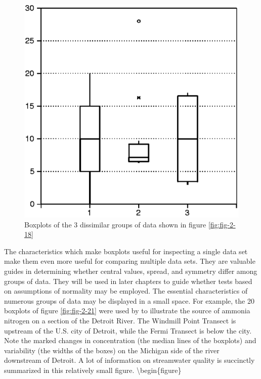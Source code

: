 \documentclass[]{book}
\begin{document}
\begin{figure}

{\centering \includegraphics[width=9.26in]{figures/2_20} 

}

\caption{Boxplots of the 3 dissimilar groups of data shown in figure \ref{fig:fig-2-18}}\label{fig:fig-2-20}
\end{figure}

The characteristics which make boxplots useful for inspecting a single data set make them even more useful for comparing multiple data sets. They are valuable guides in determining whether central values, spread, and symmetry differ among groups of data. They will be used in later chapters to guide whether tests based on assumptions of normality may be employed. The essential characteristics of numerous groups of data may be displayed in a small space. For example, the 20 boxplots of figure \ref{fig:fig-2-21} were used by \citet{holtschlag_changes_1987} to illustrate the source of ammonia nitrogen on a section of the Detroit River. The Windmill Point Transect is upstream of the U.S. city of Detroit, while the Fermi Transect is below the city. Note the marked changes in concentration (the median lines of the boxplots) and variability (the widths of the boxes) on the Michigan side of the river downstream of Detroit. A lot of information on streamwater quality is succinctly summarized in this relatively small figure.
\textbackslash{}begin\{figure\}
\end{document}
